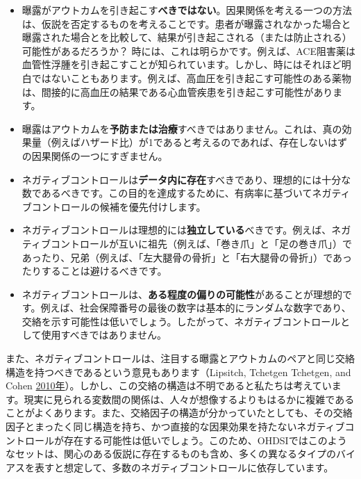 \documentclass[
  11pt]{book}
\theoremstyle{definition}
\theoremstyle{definition}
\theoremstyle{definition}
\theoremstyle{definition}
\theoremstyle{remark}
\begin{document}
\begin{itemize}
\item
  曝露がアウトカムを引き起こす\textbf{べきではない}。因果関係を考える一つの方法は、仮説を否定するものを考えることです。患者が曝露されなかった場合と曝露された場合とを比較して、結果が引き起こされる（または防止される）可能性があるだろうか？ 時には、これは明らかです。例えば、ACE阻害薬は血管性浮腫を引き起こすことが知られています。しかし、時にはそれほど明白ではないこともあります。例えば、高血圧を引き起こす可能性のある薬物は、間接的に高血圧の結果である心血管疾患を引き起こす可能性があります。
\item
  曝露はアウトカムを\textbf{予防または治療}すべきではありません。これは、真の効果量（例えばハザード比）が1であると考えるのであれば、存在しないはずの因果関係の一つにすぎません。
\item
  ネガティブコントロールは\textbf{データ内に存在}すべきであり、理想的には十分な数であるべきです。この目的を達成するために、有病率に基づいてネガティブコントロールの候補を優先付けします。
\item
  ネガティブコントロールは理想的には\textbf{独立している}べきです。例えば、ネガティブコントロールが互いに祖先（例えば、「巻き爪」と「足の巻き爪」）であったり、兄弟（例えば、「左大腿骨の骨折」と「右大腿骨の骨折」）であったりすることは避けるべきです。
\item
  ネガティブコントロールは、\textbf{ある程度の偏りの可能性}があることが理想的です。例えば、社会保障番号の最後の数字は基本的にランダムな数字であり、交絡を示す可能性は低いでしょう。したがって、ネガティブコントロールとして使用すべきではありません。
\end{itemize}

また、ネガティブコントロールは、注目する曝露とアウトカムのペアと同じ交絡構造を持つべきであるという意見もあります（Lipsitch, Tchetgen Tchetgen, and Cohen \href{https://ohdsi.github.io/TheBookOfOhdsi/MethodValidity.html\#ref-lipsitch_2010}{2010年}）。しかし、この交絡の構造は不明であると私たちは考えています。現実に見られる変数間の関係は、人々が想像するよりもはるかに複雑であることがよくあります。また、交絡因子の構造が分かっていたとしても、その交絡因子とまったく同じ構造を持ち、かつ直接的な因果効果を持たないネガティブコントロールが存在する可能性は低いでしょう。このため、OHDSIではこのようなセットは、関心のある仮説に存在するものも含め、多くの異なるタイプのバイアスを表すと想定して、多数のネガティブコントロールに依存しています。
\end{document}
